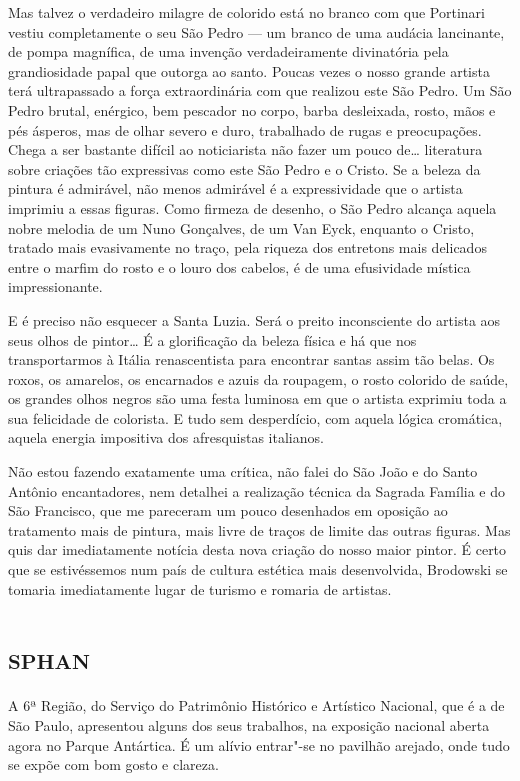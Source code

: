 Mas talvez o verdadeiro milagre de colorido está no branco com que
Portinari vestiu completamente o seu São Pedro --- um branco de uma
audácia lancinante, de pompa magnífica, de uma invenção verdadeiramente
divinatória pela grandiosidade papal que outorga ao santo. Poucas vezes
o nosso grande artista terá ultrapassado a força extraordinária com que
realizou este São Pedro. Um São Pedro brutal, enérgico, bem pescador no
corpo, barba desleixada, rosto, mãos e pés ásperos, mas de olhar severo
e duro, trabalhado de rugas e preocupações. Chega a ser bastante difícil
ao noticiarista não fazer um pouco de\ldots{} literatura sobre criações tão
expressivas como este São Pedro e o Cristo. Se a beleza da pintura é
admirável, não menos admirável é a expressividade que o artista imprimiu
a essas figuras. Como firmeza de desenho, o São Pedro alcança aquela
nobre melodia de um Nuno Gonçalves, de um Van Eyck, enquanto o Cristo,
tratado mais evasivamente no traço, pela riqueza dos entretons mais
delicados entre o marfim do rosto e o louro dos cabelos, é de uma
efusividade mística impressionante.

E é preciso não esquecer a Santa Luzia. Será o preito inconsciente do
artista aos seus olhos de pintor\ldots{} É a glorificação da beleza física e
há que nos transportarmos à Itália renascentista para encontrar santas
assim tão belas. Os roxos, os amarelos, os encarnados e azuis da
roupagem, o rosto colorido de saúde, os grandes olhos negros são uma
festa luminosa em que o artista exprimiu toda a sua felicidade de
colorista. E tudo sem desperdício, com aquela lógica cromática, aquela
energia impositiva dos afresquistas italianos.

Não estou fazendo exatamente uma crítica, não falei do São João e do
Santo Antônio encantadores, nem detalhei a realização técnica da Sagrada
Família e do São Francisco, que me pareceram um pouco desenhados em
oposição ao tratamento mais de pintura, mais livre de traços de limite
das outras figuras. Mas quis dar imediatamente notícia desta nova
criação do nosso maior pintor. É certo que se estivéssemos num país de
cultura estética mais desenvolvida, Brodowski se tomaria imediatamente
lugar de turismo e romaria de artistas.

\chapter{\textsc{sphan}}

A 6ª Região, do Serviço do Patrimônio Histórico e Artístico Nacional,
que é a de São Paulo, apresentou alguns dos seus trabalhos, na exposição
nacional aberta agora no Parque Antártica. É um alívio entrar"-se no
pavilhão arejado, onde tudo se expõe com bom gosto e clareza.

